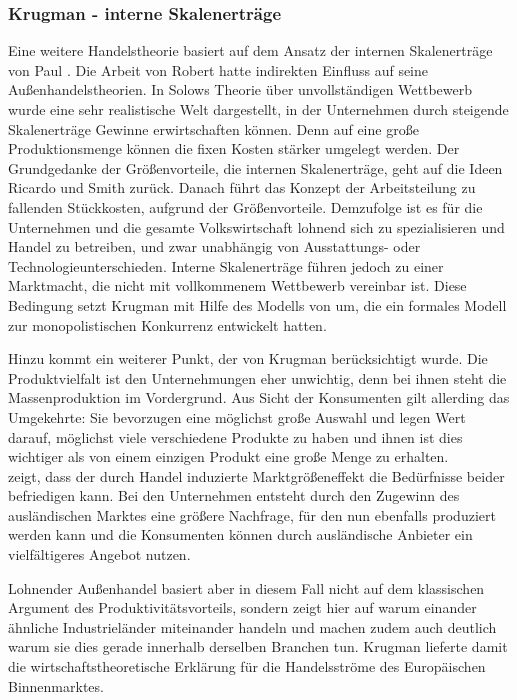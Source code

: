 \subsubsection{Krugman - interne Skalenerträge}
Eine weitere Handelstheorie basiert auf dem Ansatz der internen Skalenerträge von Paul \citet{Krugman.79}. Die Arbeit von Robert \citet{Solow.1956} hatte indirekten Einfluss auf seine Au{\ss}enhandelstheorien. In Solows Theorie {\"u}ber unvollst{\"a}ndigen Wettbewerb wurde eine sehr realistische Welt dargestellt, in der Unternehmen durch steigende Skalenertr{\"a}ge Gewinne erwirtschaften k{\"o}nnen. Denn auf eine gro{\ss}e Produktionsmenge können die fixen Kosten stärker umgelegt werden. 
Der Grundgedanke der Gr{\"o}{\ss}envorteile, die internen Skalenertr{\"a}ge, geht auf die Ideen Ricardo und Smith zur{\"u}ck. Danach f{\"u}hrt das Konzept der Arbeitsteilung zu fallenden St{\"u}ckkosten, aufgrund der Gr{\"o}{\ss}envorteile. Demzufolge ist es für die Unternehmen und die gesamte Volkswirtschaft lohnend sich zu spezialisieren und Handel zu betreiben, und zwar unabhängig von Ausstattungs- oder Technologieunterschieden. Interne Skalen\-ertr{\"a}ge f{\"u}hren jedoch zu einer Marktmacht, die nicht mit vollkommenem Wettbewerb vereinbar ist. Diese Bedingung setzt Krugman mit Hilfe des Modells von \citet{Dixit.1977} um, die ein formales Modell zur monopolistischen Konkurrenz entwickelt hatten.\newline


Hinzu kommt ein weiterer Punkt, der von Krugman berücksichtigt wurde. Die Produktvielfalt ist den Unternehmungen eher unwichtig, denn bei ihnen steht die Massenproduktion im Vordergrund. Aus Sicht der Konsumenten gilt allerding das Umgekehrte: Sie bevorzugen eine m{\"o}glichst gro{\ss}e Auswahl und legen Wert darauf, möglichst viele verschiedene Produkte zu haben und ihnen ist dies wichtiger als von einem einzigen Produkt eine gro{\ss}e Menge zu erhalten.\\
\citet{Krugman.79} zeigt, dass der durch Handel induzierte Marktgrö{\ss}eneffekt die Bed{\"u}rfnisse beider befriedigen kann. Bei den Unternehmen entsteht durch den Zugewinn des ausländischen Marktes eine gr{\"o}{\ss}ere Nachfrage, f{\"u}r den nun ebenfalls produziert werden kann und die Konsumenten k{\"o}nnen durch ausl{\"a}ndische Anbieter ein vielf{\"a}ltigeres Angebot nutzen. \newline


Lohnender Au{\ss}enhandel basiert aber in diesem Fall nicht auf dem klassischen Argument des Produktivit{\"a}tsvorteils, sondern zeigt hier auf warum einander {\"a}hnliche Industriel{\"a}nder miteinander handeln und machen zudem auch deutlich warum sie dies  gerade innerhalb derselben Branchen tun. Krugman lieferte damit die wirtschaftstheoretische Erklärung f{\"u}r die Handelsströme des Europ{\"a}ischen Binnenmarktes.\newline



